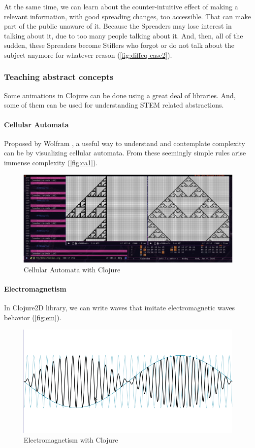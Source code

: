 \documentclass[
12pt,				%
openright,			%
oneside,			%
a4paper,			%
brazil,				%
english,			%
]{abntex2}
\begin{document}
At the same time, we can learn about the counter-intuitive effect of making a relevant information, with good spreading changes, too accessible. That can make part of the public unaware of it. Because the Spreaders may lose interest in talking about it, due to too many people talking about it. And, then, all of the sudden, these Spreaders become Stiflers who forgot or do not talk about the subject anymore for whatever reason (\autoref{fig:diffeq-case2}).
\clearpage
\subsubsection{Teaching abstract concepts}

Some animations in Clojure can be done using a great deal of
libraries. And, some of them can be used for understanding STEM
related abstractions.

\paragraph{Cellular Automata}

Proposed by Wolfram \cite{wolfram1983cellular}, a useful way to
understand and contemplate complexity can be by visualizing cellular
automata. From these seemingly simple rules arise immense complexity (\autoref{fig:ca1}).

\begin{figure}[ht]
  \centering
    \caption{\label{fig:ca1} Cellular Automata with Clojure}
  \includegraphics[width=0.7\linewidth]{Imagens/CA/ca1.png}
\end{figure}

\paragraph{Electromagnetism}

In Clojure2D library, we can write waves that imitate electromagnetic
waves behavior (\autoref{fig:em}). 

\begin{figure}[ht]
  \centering
    \caption{\label{fig:em} Electromagnetism with Clojure}
  \includegraphics[width=0.7\linewidth]{Imagens/CA/eletromag-is.png}
\end{figure}
\end{document}
